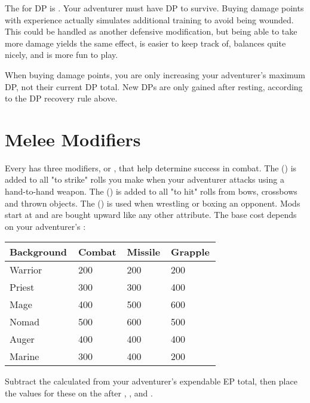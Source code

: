 \begin{multicols*}{2}
The  for DP is . Your adventurer must have DP to survive. Buying damage points with experience actually simulates additional training to avoid being wounded. This could be handled as another defensive modification, but being able to take more damage yields the same effect, is easier to keep track of, balances quite nicely, and is more fun to play.

When buying damage points, you are only increasing your adventurer's maximum DP, not their current DP total. New DPs are only gained after resting, according to the DP recovery rule above.
\section{Melee Modifiers}
Every  has three modifiers, or , that help determine success in combat. The  (\CM) is added to all  "to strike" rolls you make when your adventurer attacks using a hand-to-hand weapon. The  (\MM) is added to all "to hit" rolls from bows, crossbows and thrown objects. The  (\GM) is used when wrestling or boxing an opponent. Mods start at   and are bought upward like any other attribute. The base cost depends on your adventurer's :

\begin{normbox}
\small
\begin{tabular}{@{} p{0.25\linewidth} p{0.15\linewidth} p{0.15\linewidth} p{0.15\linewidth}}
\textbf{Background} & \textbf{Combat} & \textbf{Missile} & \textbf{Grapple}\\
\midrule
Warrior & 200 & 200 & 200\\
Priest & 300 & 300 & 400\\
Mage & 400 & 500 & 600\\
Nomad & 500 & 600 & 500\\
Auger & 400 & 400 & 400\\
Marine & 300 & 400 & 200\\
\end{tabular}
\end{normbox}

Subtract the calculated \EP from your adventurer's expendable EP total, then place the values for these on the  after , , and .

\end{multicols*}
